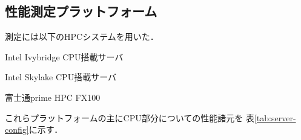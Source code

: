\documentclass[submit,techrep,noauthor]{ipsj}
\begin{document}
\subsection{性能測定プラットフォーム}

測定には以下のHPCシステムを用いた．
\begin{itemize}
{
\item Intel Ivybridge CPU搭載サーバ
\item Intel Skylake CPU搭載サーバ
\item 富士通prime HPC FX100
}
\end{itemize}

これらプラットフォームの主にCPU部分についての性能諸元を
表\ref{tab:server-config}に示す．
\newif\ifTwoservers
\newif\ifThreeservers
\Twoserversfalse
\Threeserverstrue
\end{document}
